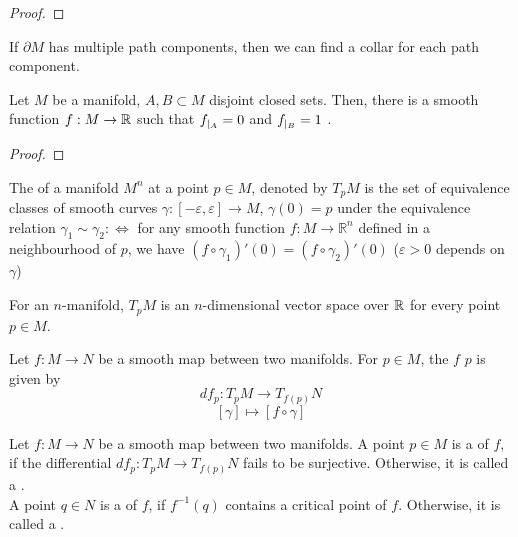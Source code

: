 \documentclass[a4paper,11pt]{article}
\begin{document}
\begin{proof}
\end{proof}

\begin{observation}
    If \(\partial M\) has multiple path components, then we can find a collar for each path component.
\end{observation}

\begin{theorem}\label{urysohn}
    Let \(M\) be a manifold, \(A,B\subset M\) disjoint closed sets. Then, there is a smooth function \(f:M\to\mathbb{R}\) such that \(f_{|_{A}}=0\) and \(f_{|_{B}}=1\)
.
\end{theorem}

\begin{proof}
\end{proof}

\begin{definition}
    The  of a manifold \(M^n\) at a point \(p\in M\), denoted by \(T_p M\) is the set of equivalence classes of smooth curves \(\gamma:[-\varepsilon,\varepsilon]\to M\), \(\gamma(0)=p\) under the equivalence relation \(\gamma_1\sim\gamma_2:\Leftrightarrow\) for any smooth function \(f:M\to\mathbb{R}^n\) defined in a neighbourhood of \(p\), we have \((f\circ\gamma_1)'(0)=(f\circ\gamma_2)'(0)\) (\(\varepsilon>0\) depends on \(\gamma\))
\end{definition}

\begin{remark}
    For an \(n\)-manifold, \(T_p M\) is an \(n\)-dimensional vector space over \(\mathbb{R}\) for every point \(p\in M\). 
\end{remark}

\begin{definition}
    Let \(f:M\to N\) be a smooth map between two manifolds. For \(p\in M\), the  \(f\)  \(p\) is given by
    \[df_p:T_p M\to T_{f(p)}N\]
    \[[\gamma]\mapsto[f\circ \gamma]\]
\end{definition}

\begin{definition}
    Let \(f:M\to N\) be a smooth map between two manifolds. A point \(p\in M\) is a  of \(f\), if the differential \(df_p:T_p M\to T_{f(p)}N\) fails to be surjective. Otherwise, it is called a .\\
    A point \(q\in N\) is a  of \(f\), if \(f^{-1}(q)\) contains a critical point of \(f\). Otherwise, it is called a .
\end{definition}
\end{document}
